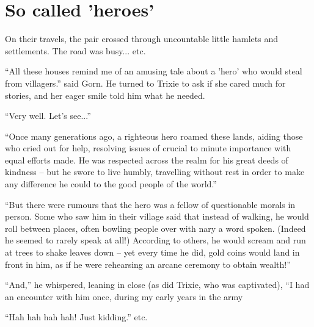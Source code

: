 
\scenesep

\section{So called 'heroes'}

On their travels, the pair crossed through uncountable little hamlets and
settlements. The road was busy... etc.

``All these houses remind me of an amusing tale about a 'hero' who would steal
from villagers.'' said Gorn. He turned to Trixie to ask if she cared much for
stories, and her eager smile told him what he needed.

``Very well. Let's see...''

``Once many generations ago, a righteous hero roamed these lands, aiding those
who cried out for help, resolving issues of crucial to minute importance with
equal efforts made. He was respected across the realm for his great deeds of
kindness -- but he swore to live humbly, travelling without rest in order to
make any difference he could to the good people of the world.''

``But there were rumours that the hero was a fellow of questionable morals in
person. Some who saw him in their village said that instead of walking, he would
roll between places, often bowling people over with nary a word spoken. (Indeed
he seemed to rarely speak at all!) According to others, he would scream and run
at trees to shake leaves down -- yet every time he did, gold coins would land in
front in him, as if he were rehearsing an arcane ceremony to obtain wealth!''

``And,'' he whispered, leaning in close (as did Trixie, who was captivated),
``I had an encounter with him once, during my early years in the army

``Hah hah hah hah! Just kidding.'' etc.

